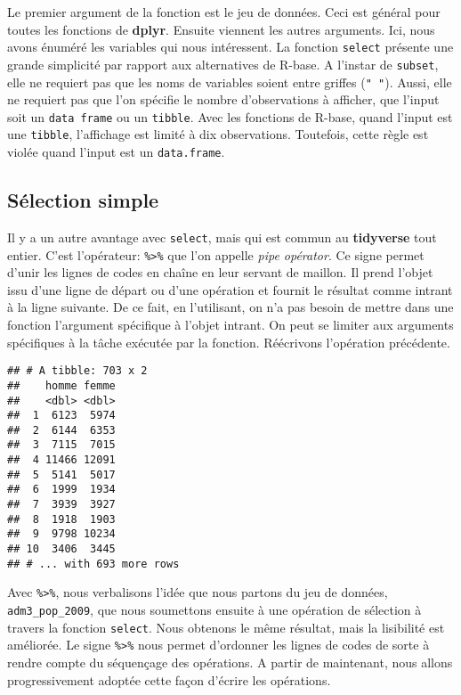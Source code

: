 \documentclass[]{book}
\newenvironment{Shaded}{\begin{snugshade}}{\end{snugshade}}
\newcommand{\KeywordTok}[1]{\textcolor[rgb]{0.13,0.29,0.53}{\textbf{#1}}}
\newcommand{\DecValTok}[1]{\textcolor[rgb]{0.00,0.00,0.81}{#1}}
\newcommand{\StringTok}[1]{\textcolor[rgb]{0.31,0.60,0.02}{#1}}
\newcommand{\OperatorTok}[1]{\textcolor[rgb]{0.81,0.36,0.00}{\textbf{#1}}}
\newcommand{\NormalTok}[1]{#1}
\begin{document}
Le premier argument de la fonction est le jeu de données. Ceci est
général pour toutes les fonctions de \textbf{dplyr}. Ensuite viennent
les autres arguments. Ici, nous avons énuméré les variables qui nous
intéressent. La fonction \texttt{select} présente une grande simplicité
par rapport aux alternatives de R-base. A l'instar de \texttt{subset},
elle ne requiert pas que les noms de variables soient entre griffes
(\texttt{"\ "}). Aussi, elle ne requiert pas que l'on spécifie le nombre
d'observations à afficher, que l'input soit un \texttt{data\ frame} ou
un \texttt{tibble}. Avec les fonctions de R-base, quand l'input est une
\texttt{tibble}, l'affichage est limité à dix observations. Toutefois,
cette règle est violée quand l'input est un \texttt{data.frame}.

\subsection{Sélection simple}\label{selection-simple}

Il y a un autre avantage avec \texttt{select}, mais qui est commun au
\textbf{tidyverse} tout entier. C'est l'opérateur:
\texttt{\%\textgreater{}\%} que l'on appelle \emph{pipe opérator}. Ce
signe permet d'unir les lignes de codes en chaîne en leur servant de
maillon. Il prend l'objet issu d'une ligne de départ ou d'une opération
et fournit le résultat comme intrant à la ligne suivante. De ce fait, en
l'utilisant, on n'a pas besoin de mettre dans une fonction l'argument
spécifique à l'objet intrant. On peut se limiter aux arguments
spécifiques à la tâche exécutée par la fonction. Réécrivons l'opération
précédente.

\begin{Shaded}
\end{Shaded}

\begin{verbatim}
## # A tibble: 703 x 2
##    homme femme
##    <dbl> <dbl>
##  1  6123  5974
##  2  6144  6353
##  3  7115  7015
##  4 11466 12091
##  5  5141  5017
##  6  1999  1934
##  7  3939  3927
##  8  1918  1903
##  9  9798 10234
## 10  3406  3445
## # ... with 693 more rows
\end{verbatim}

Avec \texttt{\%\textgreater{}\%}, nous verbalisons l'idée que nous
partons du jeu de données, \texttt{adm3\_pop\_2009}, que nous soumettons
ensuite à une opération de sélection à travers la fonction
\texttt{select}. Nous obtenons le même résultat, mais la lisibilité est
améliorée. Le signe \texttt{\%\textgreater{}\%} nous permet d'ordonner
les lignes de codes de sorte à rendre compte du séquençage des
opérations. A partir de maintenant, nous allons progressivement adoptée
cette façon d'écrire les opérations.
\end{document}
